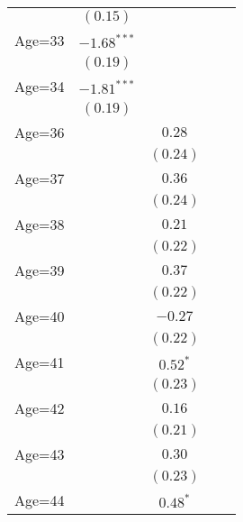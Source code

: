 \documentclass[fullpage]{paper}
\begin{document}
\begin{center}
\begin{longtable}{l c c c c }
            & $(0.15)$      &               &               &               \\
Age=33      & $-1.68^{***}$ &               &               &               \\
            & $(0.19)$      &               &               &               \\
Age=34      & $-1.81^{***}$ &               &               &               \\
            & $(0.19)$      &               &               &               \\
Age=36      &               & $0.28$        &               &               \\
            &               & $(0.24)$      &               &               \\
Age=37      &               & $0.36$        &               &               \\
            &               & $(0.24)$      &               &               \\
Age=38      &               & $0.21$        &               &               \\
            &               & $(0.22)$      &               &               \\
Age=39      &               & $0.37$        &               &               \\
            &               & $(0.22)$      &               &               \\
Age=40      &               & $-0.27$       &               &               \\
            &               & $(0.22)$      &               &               \\
Age=41      &               & $0.52^{*}$    &               &               \\
            &               & $(0.23)$      &               &               \\
Age=42      &               & $0.16$        &               &               \\
            &               & $(0.21)$      &               &               \\
Age=43      &               & $0.30$        &               &               \\
            &               & $(0.23)$      &               &               \\
Age=44      &               & $0.48^{*}$    &               &               \\

\end{longtable}
\end{center}
\end{document}
